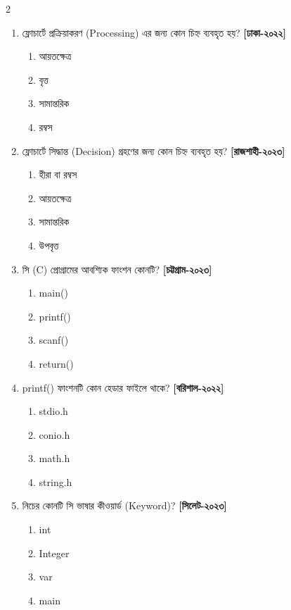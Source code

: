 \begin{multicols}{2}
\begin{enumerate}[resume]

\item ফ্লোচার্টে প্রক্রিয়াকরণ (Processing) এর জন্য কোন চিহ্ন ব্যবহৃত হয়? \textbf{[ঢাকা-২০২২]}
\begin{enumerate}[label=\alph*)]
\item আয়তক্ষেত্র \checkmark
\item বৃত্ত
\item সামান্তরিক
\item রম্বস
\end{enumerate}

\item ফ্লোচার্টে সিদ্ধান্ত (Decision) গ্রহণের জন্য কোন চিহ্ন ব্যবহৃত হয়? \textbf{[রাজশাহী-২০২৩]}
\begin{enumerate}[label=\alph*)]
\item হীরা বা রম্বস \checkmark
\item আয়তক্ষেত্র
\item সামান্তরিক
\item উপবৃত্ত
\end{enumerate}

\item সি (C) প্রোগ্রামের আবশ্যিক ফাংশন কোনটি? \textbf{[চট্টগ্রাম-২০২৩]}
\begin{enumerate}[label=\alph*)]
\item main() \checkmark
\item printf()
\item scanf()
\item return()
\end{enumerate}

\item printf() ফাংশনটি কোন হেডার ফাইলে থাকে? \textbf{[বরিশাল-২০২২]}
\begin{enumerate}[label=\alph*)]
\item stdio.h \checkmark
\item conio.h
\item math.h
\item string.h
\end{enumerate}

\item নিচের কোনটি সি ভাষার কীওয়ার্ড (Keyword)? \textbf{[সিলেট-২০২৩]}
\begin{enumerate}[label=\alph*)]
\item int \checkmark
\item Integer
\item var
\item main
\end{enumerate}

\end{enumerate}
\end{multicols}

